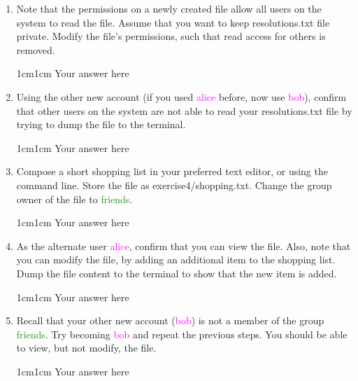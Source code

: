 \documentclass[11pt,letterpaper]{article}
\newenvironment{answer}{\em \color{blue} \begin{adjustwidth}{1cm}{1cm}}{\end{adjustwidth}}
\begin{document}
\begin{enumerate}
		\item Note that the permissions on a newly created file allow all users on the system to read the file. Assume that you want to keep resolutions.txt file private. Modify the file's permissions, such that read access for others is removed. 
		
		\begin{answer}
			Your answer here
		\end{answer}
		
		
		\item Using the other new account (if you used \textcolor{magenta}{alice} before, now use \textcolor{magenta}{bob}), confirm that other users on the system are not able to read your resolutions.txt file by trying to dump the file to the terminal.
		
		\begin{answer}
			Your answer here
		\end{answer}
		
		\item Compose a short shopping list in your preferred text editor, or using the command line. Store the file as exercise4/shopping.txt. Change the group owner of the file to \textcolor{ForestGreen}{friends}.
		
		\begin{answer}
			Your answer here
		\end{answer}
		
		\item As the alternate user \textcolor{magenta}{alice}, confirm that you can view the file. Also, note that you can modify the file, by adding an additional item to the shopping list. Dump the file content to the terminal to show that the new item is added.
		
		\begin{answer}
			Your answer here
		\end{answer}
		
		\item Recall that your other new account (\textcolor{magenta}{bob}) is not a member of the group \textcolor{ForestGreen}{friends}. Try becoming \textcolor{magenta}{bob} and repeat the previous steps. You should be able to view, but not modify, the file.
		
		\begin{answer}
			Your answer here
		\end{answer}
		

\end{enumerate}
\end{document}
